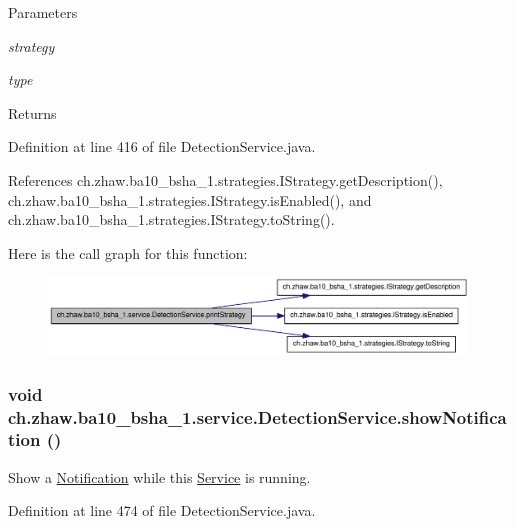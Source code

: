 \begin{DoxyParams}{Parameters}
\item[{\em strategy}]\item[{\em type}]\end{DoxyParams}
\begin{DoxyReturn}{Returns}

\end{DoxyReturn}


Definition at line 416 of file DetectionService.java.

References ch.zhaw.ba10\_\-bsha\_\-1.strategies.IStrategy.getDescription(), ch.zhaw.ba10\_\-bsha\_\-1.strategies.IStrategy.isEnabled(), and ch.zhaw.ba10\_\-bsha\_\-1.strategies.IStrategy.toString().

Here is the call graph for this function:\nopagebreak
\begin{figure}[H]
\begin{center}
\leavevmode
\includegraphics[width=316pt]{classch_1_1zhaw_1_1ba10__bsha__1_1_1service_1_1DetectionService_a201836f7453d62a935b7eed1203b27f6_cgraph}
\end{center}
\end{figure}
\hypertarget{classch_1_1zhaw_1_1ba10__bsha__1_1_1service_1_1DetectionService_a916374be5bffc9ece850bb0cc92d480f}{
\subsubsection[{showNotification}]{\setlength{\rightskip}{0pt plus 5cm}void ch.zhaw.ba10\_\-bsha\_\-1.service.DetectionService.showNotification ()}}
\label{classch_1_1zhaw_1_1ba10__bsha__1_1_1service_1_1DetectionService_a916374be5bffc9ece850bb0cc92d480f}
Show a \hyperlink{}{Notification} while this \hyperlink{}{Service} is running. 

Definition at line 474 of file DetectionService.java.

